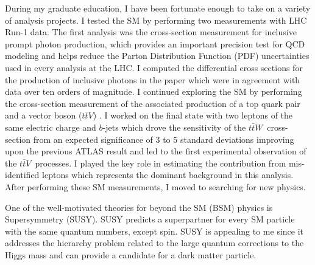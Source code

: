 \documentclass[a4paper]{article}
\newcommand{\ttbarV}{\ensuremath{t\bar{t}V}}
\newcommand{\ttbarW}{\ensuremath{t\bar{t}W}}
\begin{document}
During my graduate education, I have been fortunate enough to take on a variety of analysis projects. I tested the SM by performing two measurements
with LHC Run-1 data. The first analysis was the cross-section measurement for inclusive prompt photon production,
which provides an important precision test for QCD modeling and helps reduce the Parton Distribution Function (PDF) uncertainties used in
every analysis at the LHC. I computed the differential cross sections for the production of inclusive photons
in the paper \cite{paper-2015-Photon} which were in agreement with data over ten orders of magnitude.
I continued exploring the SM by performing the cross-section measurement of the associated production of a top quark pair
and a vector boson (\ttbarV) \cite{paper-2015-ttV}.
I worked on the final state with two leptons of the same electric charge and $b$-jets which
drove the sensitivity of the \ttbarW~cross-section from an expected significance of 3 to 5 standard deviations improving upon the previous ATLAS result
and led to the first experimental observation of the \ttbarV~processes.
I played the key role in estimating the contribution from mis-identified leptons which represents the dominant background in this analysis.
After performing these SM measurements, I moved to searching for new physics.

One of the well-motivated theories for beyond the SM (BSM) physics is Supersymmetry (SUSY). SUSY predicts a superpartner
for every SM particle with the same quantum numbers, except spin. SUSY is appealing to me since it addresses the hierarchy problem related
to the large quantum corrections to the Higgs mass and can provide a candidate for a dark matter particle.
\end{document}
